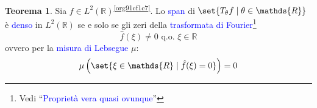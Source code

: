 \documentclass[10pt]{book}
\newcommand{\1}{\mathds{1}}
\newcommand{\R}{\mathds{R}}
\theoremstyle{definition}%
\newtheorem{thm}{Teorema}[section]
\theoremstyle{plain}
\theoremstyle{remark}
\renewcommand{\href}[2]{\textcolor{blue}{#2}}
\begin{document}
\begin{thm}
Sia \(f \in L^{2}(\R)\)\textsuperscript{\ref{org91cf1c7}}. Lo \href{../../../../../org/roam/20250630122400-span.org}{span} di \(\set{T_{\theta}f\mid \theta \in \R}\) è \href{../../../../../org/roam/20250301193045-sottoinsieme_denso.org}{denso} in \(L^{2}(\R)\) se e solo se gli zeri della \href{../../../../../org/roam/20250630121906-trasformata_di_fourier.org}{trasformata di Fourier}\footnote{Vedi ``\href{../../../../../org/roam/20250630122745-proprieta_vera_quasi_ovunque.org}{Proprietà vera quasi ovunque}''}
\begin{equation*}
\hat{f}(\xi) \neq 0\text{ q.o. }\xi \in \R
\end{equation*}
ovvero per la \href{../../../../../org/roam/20250630122824-misura_di_lebesgue.org}{misura di Lebsegue} \(\mu\):
\begin{equation*}
\mu\left(\set{\xi \in \R\mid \hat{f}(\xi) = 0}\right) = 0
\end{equation*}
\label{teo:wt2}
\end{thm}
\end{document}
